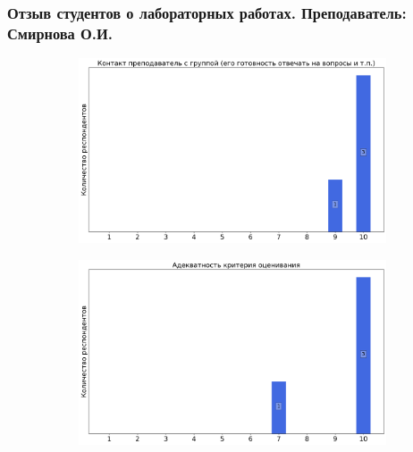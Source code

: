 	\subsubsection{Отзыв студентов о лабораторных работах. Преподаватель: Смирнова О.И.}
		\begin{figure}[H]
			\centering
			\begin{subfigure}[b]{0.45\textwidth}
				\centering
				\includegraphics[width=\textwidth]{images/2 course/Общая физика - электричество и магнетизм/labniks-marks-Смирнова О.И.-0.png}
			\end{subfigure}
			\begin{subfigure}[b]{0.45\textwidth}
				\centering
				\includegraphics[width=\textwidth]{images/2 course/Общая физика - электричество и магнетизм/labniks-marks-Смирнова О.И.-1.png}
			\end{subfigure}
			\begin{subfigure}[b]{0.45\textwidth}
				\centering

\end{subfigure}
\end{figure}
